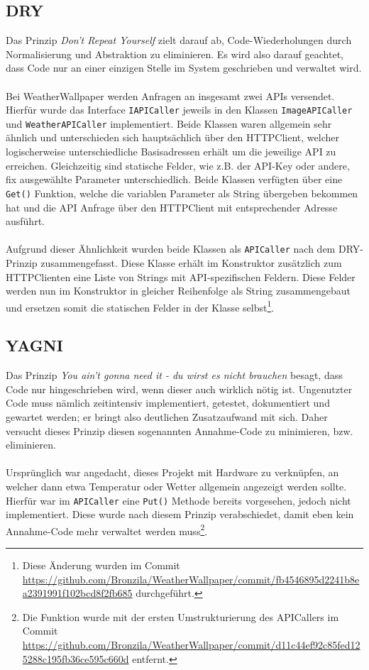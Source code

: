 \subsection{DRY}
\label{sec:dry}
Das Prinzip \textit{Don't Repeat Yourself} zielt darauf ab, Code-Wiederholungen durch Normalisierung und Abstraktion zu eliminieren.
Es wird also darauf geachtet, dass Code nur an einer einzigen Stelle im System geschrieben und verwaltet wird.\\
\\
Bei WeatherWallpaper werden Anfragen an insgesamt zwei APIs versendet.
Hierfür wurde das Interface \texttt{IAPICaller} jeweils in den Klassen \texttt{ImageAPICaller} und \texttt{WeatherAPICaller} implementiert.
Beide Klassen waren allgemein sehr ähnlich und unterschieden sich hauptsächlich über den HTTPClient, welcher logischerweise unterschiedliche Basisadressen erhält um die jeweilige API zu erreichen.
Gleichzeitig sind statische Felder, wie z.B. der API-Key oder andere, fix ausgewählte Parameter unterschiedlich.
Beide Klassen verfügten über eine \texttt{Get()} Funktion, welche die variablen Parameter als String übergeben bekommen hat und die API Anfrage über den HTTPClient mit entsprechender Adresse ausführt.\\
\\
Aufgrund dieser Ähnlichkeit wurden beide Klassen als \texttt{APICaller} nach dem DRY-Prinzip zusammengefasst.
Diese Klasse  erhält im Konstruktor zusätzlich zum HTTPClienten eine Liste von Strings mit API-spezifischen Feldern.
Diese Felder werden nun im Konstruktor in gleicher Reihenfolge als String zusammengebaut und ersetzen somit die statischen Felder in der Klasse selbst\footnote{Diese Änderung wurden im Commit \url{https://github.com/Bronzila/WeatherWallpaper/commit/fb4546895d2241b8ea2391991f102bcd8f2fb685} durchgeführt.}.
\subsection{YAGNI}
Das Prinzip \textit{You ain't gonna need it - du wirst es nicht brauchen} besagt, dass Code nur hingeschrieben wird, wenn dieser auch wirklich nötig ist.
Ungenutzter Code muss nämlich zeitintensiv implementiert, getestet, dokumentiert und gewartet werden; er bringt also deutlichen Zusatzaufwand mit sich.
Daher versucht dieses Prinzip diesen sogenannten Annahme-Code zu minimieren, bzw. eliminieren.\\
\\
Ursprünglich war angedacht, dieses Projekt mit Hardware zu verknüpfen, an welcher dann etwa Temperatur oder Wetter allgemein angezeigt werden sollte.
Hierfür war im \texttt{APICaller} eine \texttt{Put()} Methode bereits vorgesehen, jedoch nicht implementiert. 
Diese wurde nach diesem Prinzip verabschiedet, damit eben kein Annahme-Code mehr verwaltet werden muss\footnote{Die Funktion wurde mit der ersten Umstrukturierung des APICallers im Commit \url{https://github.com/Bronzila/WeatherWallpaper/commit/d11c44ef92c85fed125288c195fb36ce595c660d} entfernt.}.
